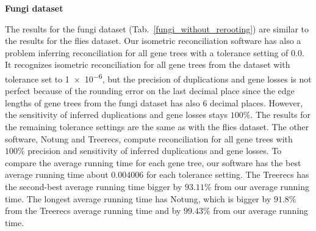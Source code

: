 \noindent \textbf{Fungi dataset}

The results for the fungi dataset (Tab.~\ref{fungi_without_rerooting}) are similar to the results for the flies dataset. Our isometric reconciliation software has also a problem inferring reconciliation for all gene trees with a tolerance setting of $0.0$. It recognizes isometric reconciliation for all gene trees from the dataset with tolerance set to \num{1e-6}, but the precision of duplications and gene losses is not perfect because of the rounding error on the last decimal place since the edge lengths of gene trees from the fungi dataset has also 6 decimal places. However, the sensitivity of inferred duplications and gene losses stays $100\%$. The results for the remaining tolerance settings are the same as with the flies dataset. The other software, Notung and Treerecs, compute reconciliation for all gene trees with $100\%$ precision and sensitivity of inferred duplications and gene losses. To compare the average running time for each gene tree, our software has the best average running time about $0.004006$ for each tolerance setting. The Treerecs has the second-best average running time bigger by $93.11\%$ from our average running time. The longest average running time has Notung, which is bigger by $91.8\%$ from the Treerecs average running time and by $99.43\%$ from our average running time.

